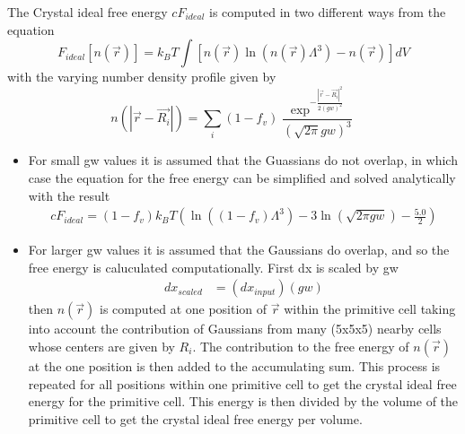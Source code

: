 \documentclass[double,12pt]{beavtex}
\begin{document}
The Crystal ideal free energy $cF_{ideal}$ is computed in two different ways from the equation 
\begin{displaymath}{F_{ideal}[n(\vec{r})]= k_BT\int[n(\vec{r})\ln(n(\vec{r})\Lambda^3)-n(\vec{r})]dV}\end{displaymath}
with the varying number density profile given by 
\begin{displaymath}
  {n(|\vec{r}-\vec{R_i}|)=\sum_i{(1-f_v)\frac{\exp^{-\frac{{|\vec{r}-\vec{R_i}|}^2}{2{(gw)}^2}}}{\left(\sqrt{2\pi}gw\right)^3}}}
\end{displaymath}
\begin{itemize}
  \item For small gw values it is assumed that the Guassians do not overlap, in
  which case the equation for the free energy can be simplified and solved
  analytically with the result
  \begin{align}
    cF_{ideal}=(1-f_v)k_BT\left(\ln((1-f_v)\Lambda^3)-3\ln(\sqrt{2\pi{gw}})-\frac{5.0}{2}\right)
  \end{align}
\item For larger gw values it is assumed that the Gaussians do overlap, and so the free energy is caluculated computationally. First dx is scaled by gw
\begin{align}
  dx_{scaled} &= (dx_{input})(gw)
\end{align}
then $n(\vec{r})$ is computed at one position of $\vec{r}$ within the primitive cell taking into account the contribution of Gaussians from many (5x5x5) nearby cells whose centers are given by $R_i$.
The contribution to the free energy of $n(\vec{r})$ at the one position is then
added to the accumulating sum.
This process is repeated for all positions within one primitive cell to get the
crystal ideal free energy for the primitive cell. This energy is then divided by
the volume of the primitive cell to get the crystal ideal free energy per
volume.
\end{itemize}
\end{document}

